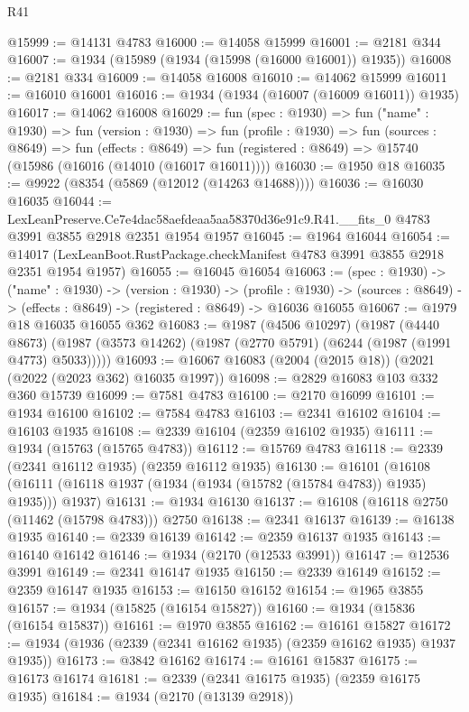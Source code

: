 \begin{lexlean}{R41}
\begin{coremodule}
@15999 := @14131 @4783
@16000 := @14058 @15999
@16001 := @2181 @344
@16007 := @1934 (@15989 (@1934 (@15998 (@16000 @16001)) @1935))
@16008 := @2181 @334
@16009 := @14058 @16008
@16010 := @14062 @15999
@16011 := @16010 @16001
@16016 := @1934 (@1934 (@16007 (@16009 @16011)) @1935)
@16017 := @14062 @16008
@16029 := fun (spec : @1930) =>
  fun ("name" : @1930) =>
  fun (version : @1930) =>
  fun (profile : @1930) =>
  fun (sources : @8649) =>
  fun (effects : @8649) =>
  fun (registered : @8649) => @15740 (@15986 (@16016 (@14010 (@16017 @16011))))
@16030 := @1950 @18
@16035 := @9922 (@8354 (@5869 (@12012 (@14263 @14688))))
@16036 := @16030 @16035
@16044 := LexLeanPreserve.Ce7e4dac58aefdeaa5aa58370d36e91c9.R41.__fits_0
    @4783
    @3991
    @3855
    @2918
    @2351
    @1954
    @1957
@16045 := @1964 @16044
@16054 := @14017 (LexLeanBoot.RustPackage.checkManifest @4783 @3991 @3855 @2918 @2351 @1954 @1957)
@16055 := @16045 @16054
@16063 := (spec : @1930) ->
  ("name" : @1930) ->
  (version : @1930) ->
  (profile : @1930) ->
  (sources : @8649) -> (effects : @8649) -> (registered : @8649) -> @16036 @16055
@16067 := @1979 @18 @16035 @16055 @362
@16083 := @1987
    (@4506 @10297)
    (@1987
      (@4440 @8673)
      (@1987 (@3573 @14262) (@1987 (@2770 @5791) (@6244 (@1987 (@1991 @4773) @5033)))))
@16093 := @16067 @16083 (@2004 (@2015 @18)) (@2021 (@2022 (@2023 @362) @16035 @1997))
@16098 := @2829 @16083 @103 @332 @360 @15739
@16099 := @7581 @4783
@16100 := @2170 @16099
@16101 := @1934 @16100
@16102 := @7584 @4783
@16103 := @2341 @16102
@16104 := @16103 @1935
@16108 := @2339 @16104 (@2359 @16102 @1935)
@16111 := @1934 (@15763 (@15765 @4783))
@16112 := @15769 @4783
@16118 := @2339 (@2341 @16112 @1935) (@2359 @16112 @1935)
@16130 := @16101
    (@16108 (@16111 (@16118 @1937 (@1934 (@1934 (@15782 (@15784 @4783)) @1935) @1935))) @1937)
@16131 := @1934 @16130
@16137 := @16108 (@16118 @2750 (@11462 (@15798 @4783))) @2750
@16138 := @2341 @16137
@16139 := @16138 @1935
@16140 := @2339 @16139
@16142 := @2359 @16137 @1935
@16143 := @16140 @16142
@16146 := @1934 (@2170 (@12533 @3991))
@16147 := @12536 @3991
@16149 := @2341 @16147 @1935
@16150 := @2339 @16149
@16152 := @2359 @16147 @1935
@16153 := @16150 @16152
@16154 := @1965 @3855
@16157 := @1934 (@15825 (@16154 @15827))
@16160 := @1934 (@15836 (@16154 @15837))
@16161 := @1970 @3855
@16162 := @16161 @15827
@16172 := @1934 (@1936 (@2339 (@2341 @16162 @1935) (@2359 @16162 @1935) @1937 @1935))
@16173 := @3842 @16162
@16174 := @16161 @15837
@16175 := @16173 @16174
@16181 := @2339 (@2341 @16175 @1935) (@2359 @16175 @1935)
@16184 := @1934 (@2170 (@13139 @2918))

\end{coremodule}
\end{lexlean}
